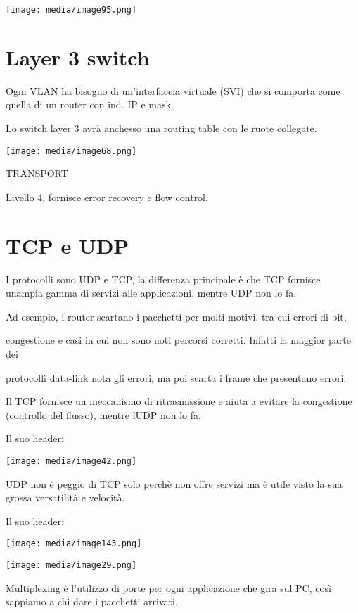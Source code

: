 \texttt{[image: media/image95.png]}

\section{Layer 3 switch}\label{layer-3-switch}

Ogni VLAN ha bisogno di un'interfaccia virtuale (SVI) che si comporta
come quella di un router con ind. IP e mask.

Lo switch layer 3 avrà anch\textquotesingle esso una routing table con
le ruote collegate.

\texttt{[image: media/image68.png]}

TRANSPORT

Livello 4, fornisce error recovery e flow control.

\section{TCP e UDP}\label{tcp-e-udp}

I protocolli sono UDP e TCP, la differenza principale è che TCP fornisce
un\textquotesingle ampia gamma di servizi alle applicazioni, mentre UDP
non lo fa.

Ad esempio, i router scartano i pacchetti per molti motivi, tra cui
errori di bit,

congestione e casi in cui non sono noti percorsi corretti. Infatti la
maggior parte dei

protocolli data-link nota gli errori, ma poi scarta i frame che
presentano errori.

Il TCP fornisce un meccanismo di ritrasmissione e aiuta a evitare la
congestione (controllo del flusso), mentre l\textquotesingle UDP non lo
fa.

Il suo header:

\texttt{[image: media/image42.png]}

UDP non è peggio di TCP solo perchè non offre servizi ma è utile visto
la sua grossa versatilità e velocità.

Il suo header:

\texttt{[image: media/image143.png]}

\texttt{[image: media/image29.png]}

Multiplexing è l'utilizzo di porte per ogni applicazione che gira sul
PC, così sappiamo a chi dare i pacchetti arrivati.

